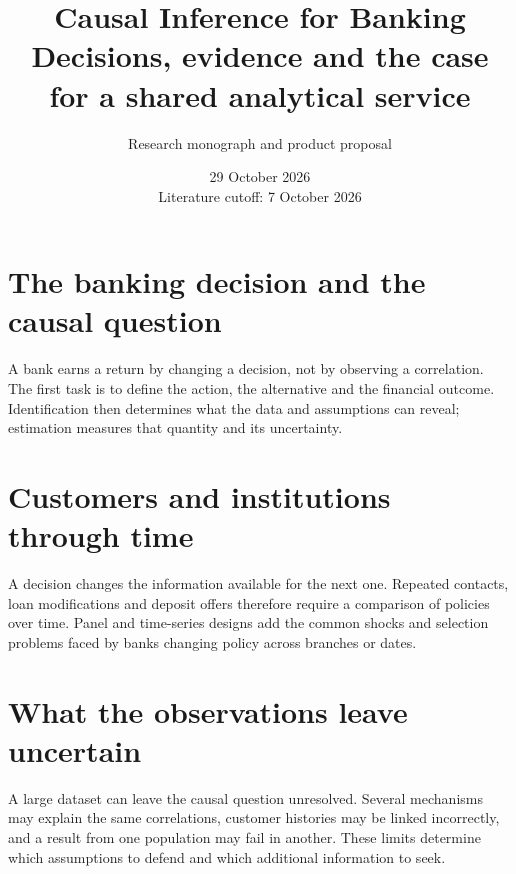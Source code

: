 \documentclass[11pt,a4paper,openany]{book}
\title{\sffamily\bfseries\color{ink}Causal Inference for Banking\\[14pt]
\Large Decisions, evidence and the case for a shared analytical service}
\author{Research monograph and product proposal}
\date{29 October 2026\\Literature cutoff: 7 October 2026}
\begin{document}
\frontmatter
\maketitle

\begingroup\setlength{\parskip}{0pt}\tableofcontents\endgroup
\mainmatter
\part{The banking decision and the causal question}
\label{reading:part-decision}
A bank earns a return by changing a decision, not by observing a correlation.
The first task is to define the action, the alternative and the financial outcome.
Identification then determines what the data and assumptions can reveal;
estimation measures that quantity and its uncertainty.






\part{Customers and institutions through time}
\label{reading:part-time}
A decision changes the information available for the next one. Repeated
contacts, loan modifications and deposit offers therefore require a comparison
of policies over time. Panel and time-series designs add the common shocks
and selection problems faced by banks changing policy across branches or dates.








\part{What the observations leave uncertain}
\label{reading:part-uncertainty}
A large dataset can leave the causal question unresolved. Several mechanisms
may explain the same correlations, customer histories may be linked incorrectly,
and a result from one population may fail in another. These limits determine
which assumptions to defend and which additional information to seek.
\end{document}
